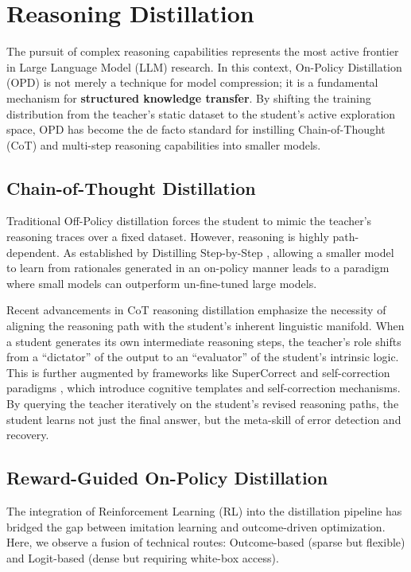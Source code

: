 \documentclass{article}
\begin{document}
\section{Reasoning Distillation}
\label{sec:reasoning}

The pursuit of complex reasoning capabilities represents the most active frontier in Large Language Model (LLM) research. In this context, On-Policy Distillation (OPD) is not merely a technique for model compression; it is a fundamental mechanism for \textbf{structured knowledge transfer}. By shifting the training distribution from the teacher's static dataset to the student's active exploration space, OPD has become the de facto standard for instilling Chain-of-Thought (CoT) and multi-step reasoning capabilities into smaller models.

\subsection{Chain-of-Thought Distillation}
Traditional Off-Policy distillation forces the student to mimic the teacher's reasoning traces over a fixed dataset. However, reasoning is highly path-dependent. As established by Distilling Step-by-Step \citep{arxiv_2305_02301}, allowing a smaller model to learn from rationales generated in an on-policy manner leads to a paradigm where small models can outperform un-fine-tuned large models. 

Recent advancements in CoT reasoning distillation \citep{arxiv_2402_00857, arxiv_2405_04434} emphasize the necessity of aligning the reasoning path with the student's inherent linguistic manifold. When a student generates its own intermediate reasoning steps, the teacher's role shifts from a ``dictator'' of the output to an ``evaluator'' of the student's intrinsic logic. This is further augmented by frameworks like SuperCorrect \citep{arxiv_2410_09008} and self-correction paradigms \citep{arxiv_2409_12917}, which introduce cognitive templates and self-correction mechanisms. By querying the teacher iteratively on the student's revised reasoning paths, the student learns not just the final answer, but the meta-skill of error detection and recovery.

\subsection{Reward-Guided On-Policy Distillation}
The integration of Reinforcement Learning (RL) into the distillation pipeline has bridged the gap between imitation learning and outcome-driven optimization. Here, we observe a fusion of technical routes: Outcome-based (sparse but flexible) and Logit-based (dense but requiring white-box access). 
\end{document}
